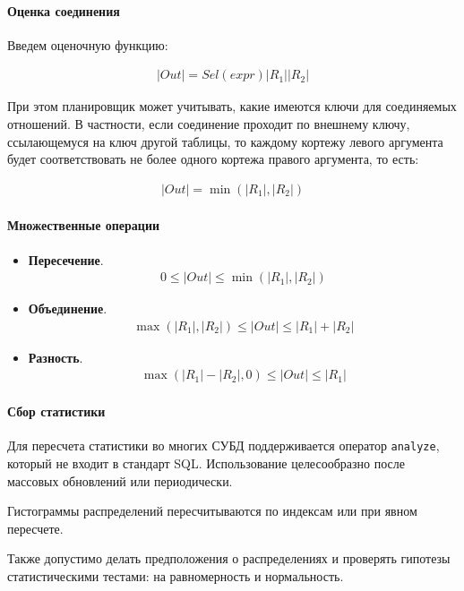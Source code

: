 \paragraph{Оценка соединения}

Введем оценочную функцию:

\begin{align}
	|Out| = Sel(expr)|R_1||R_2|
\end{align}

При этом планировщик может учитывать, какие имеются ключи для соединяемых отношений. В частности,
если соединение проходит по внешнему ключу, ссылающемуся на ключ другой таблицы, то каждому кортежу
левого аргумента будет соответствовать не более одного кортежа правого аргумента, то есть:

\begin{align}
	|Out| = \min(|R_1|, |R_2|)
\end{align}

\paragraph{Множественные операции}

\begin{itemize}
	\item \textbf{Пересечение}.
	      \begin{align}
		      0 \leq |Out| \leq \min(|R_1|, |R_2|)
	      \end{align}
	\item \textbf{Объединение}.
	      \begin{align}
		      \max(|R_1|, |R_2|) \leq |Out| \leq |R_1| + |R_2|
	      \end{align}
	\item \textbf{Разность}.
	      \begin{align}
		      \max(|R_1| - |R_2|, 0) \leq |Out| \leq |R_1|
	      \end{align}
\end{itemize}

\paragraph{Сбор статистики}

Для пересчета статистики во многих СУБД поддерживается оператор \texttt{analyze}, который не
входит в стандарт SQL. Использование целесообразно после массовых обновлений или периодически.

Гистограммы распределений пересчитываются по индексам или при явном пересчете.

Также допустимо делать предположения о распределениях и проверять гипотезы статистическими тестами:
на равномерность и нормальность.
